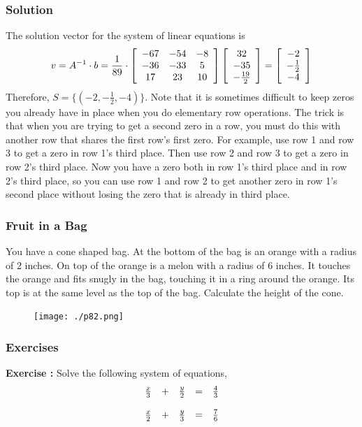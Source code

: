 \documentclass[xcolor=dvipsnames]{beamer}
\newcounter{exercise}
\newcommand{\ubung}[0]{\refstepcounter{exercise}\textbf{Exercise \arabic{exercise}: }}
\begin{document}
\begin{frame}
  \frametitle{Solution}
  The solution vector for the system of linear equations is
  \begin{equation}
    \label{eq:chiesooh}
    v=A^{-1}\cdot{}b=\frac{1}{89}\cdot\left[
      \begin{array}{ccc}
     -67&-54&-8 \\
        -36&-33&5 \\
        17&23&10
      \end{array}\right]
    \left[
      \begin{array}{c}
     32 \\
     -35 \\
     -\frac{19}{2}
      \end{array}\right]=
    \left[
      \begin{array}{c}
     -2 \\
     -\frac{1}{2} \\
     -4
      \end{array}\right]\notag
  \end{equation}
Therefore, $S=\{(-2,-\frac{1}{2},-4)\}$. Note that it is sometimes
difficult to keep zeros you already have in place when you do elementary
row operations. The trick is that when you are trying to get a second
zero in a row, you must do this with another row that shares the first
row's first zero. For example, use row 1 and row 3 to get a zero in
row 1's third place. Then use row 2 and row 3 to get a zero in
row 2's third place. Now you have a zero both in row 1's third place
and in row 2's third place, so you can use row 1 and row 2 to get
another zero in row 1's second place without losing the zero that is
already in third place.
\end{frame}

\begin{frame}
  \frametitle{Fruit in a Bag}
  You have a cone shaped bag. At the bottom of the bag is an orange
  with a radius of 2 inches. On top of the orange is a melon with a
  radius of 6 inches. It touches the orange and fits snugly in the
  bag, touching it in a ring around the orange. Its top is at the same
  level as the top of the bag. Calculate the height of the cone.
  \begin{figure}[h]
    \texttt{[image: ./p82.png]}
  \end{figure}
\end{frame}

\begin{frame}
  \frametitle{Exercises}
{\ubung} Solve the following system of equations,
\begin{equation}
  \label{eq:texeewok}
  \begin{array}{rcrcl}
\frac{x}{3}   & + & \frac{y}{2} & = & \frac{4}{3} \\ 
\hspace{.1in} &   &             &   &             \\
\frac{x}{2}   & + & \frac{y}{3} & = & \frac{7}{6}
  \end{array}
\end{equation}
\end{frame}
\end{document}
